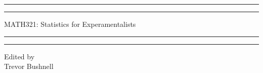 \documentclass{package/notes}
\begin{document}
	\begin{titlepage} %
		
		\centering %
		
		\scshape %
		
		\vspace*{\baselineskip} %
		
		
		\rule{\textwidth}{1.6pt}\vspace*{-\baselineskip}\vspace*{2pt} %
		\rule{\textwidth}{0.4pt} %
		
		\vspace{0.75\baselineskip} %
		
		{\huge MATH321: Statistics for Experamentalists\\} %
		
		\vspace{0.75\baselineskip} %
		
		\rule{\textwidth}{0.4pt}\vspace*{-\baselineskip}\vspace{3.2pt} %
		\rule{\textwidth}{1.6pt} %
		
		\vspace{2\baselineskip} %
		
		
		
		\vspace*{3\baselineskip} %
		
		
		
		\vspace{0.5\baselineskip} 
		
		\vspace{0.5\baselineskip} 
		
		
		\vfill 
		
		
		
		\vspace{0.3\baselineskip} 
		
		
		{\large Edited by\\  Trevor Bushnell} 
		
	\end{titlepage}
	\tableofcontents
\end{document}
